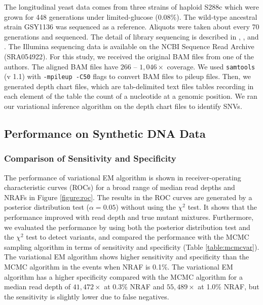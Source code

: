\documentclass{bmcart}
\begin{document}
The longitudinal yeast data comes from three strains of haploid S288c which were grown for 448 generations under limited-glucose (0.08\%).
The wild-type ancestral strain GSY1136 was sequenced as a reference.
Aliquots were taken about every 70 generations and sequenced.
The detail of library sequencing is described in \cite{kvitek2013whole}, \cite{bansal2010statistical}, and \cite{kao2008molecular}.
The Illumina sequencing data is available on the NCBI Sequence Read Archive (SRA054922)\cite{kvitek2013whole}.
For this study, we received the original BAM files from one of the authors.
The aligned BAM files have $266$ -- $1,046\times$ coverage.
We used \texttt{samtools} (v 1.1) with \texttt{-mpileup -C50} flags to convert BAM files to pileup files.
Then, we generated depth chart files, which are tab-delimited text files tables recording in each element of the table the count of a nucleotide at a genomic position.
We ran our variational inference algorithm on the depth chart files to identify SNVs.

\subsection{Performance on Synthetic DNA Data}

\subsubsection{Comparison of Sensitivity and Specificity}
The performance of variational EM algorithm is shown in receiver-operating characteristic curves (ROCs) for a broad range of median read depths and NRAFs in Figure \ref{figure:roc}.
The results in the ROC curves are generated by a posterior distribution test ($\alpha = 0.05$) without using the $\chi^2$ test.
It shows that the performance improved with read depth and true mutant mixtures.
Furthermore, we evaluated the performance by using both the posterior distribution test and the $\chi^2$ test to detect variants, and compared the performance with the MCMC sampling algorithm in terms of sensitivity and specificity (Table \ref{table:mcmcvar}).
The variational EM algorithm shows higher sensitivity and specificity than the MCMC algorithm in the events when NRAF is 0.1\%.
The variational EM algorithm has a higher specificity compared with the MCMC algorithm for a median read depth of $41,472\times$ at 0.3\% NRAF and $55,489\times$ at 1.0\% NRAF, but the sensitivity is slightly lower due to false negatives.
\end{document}
